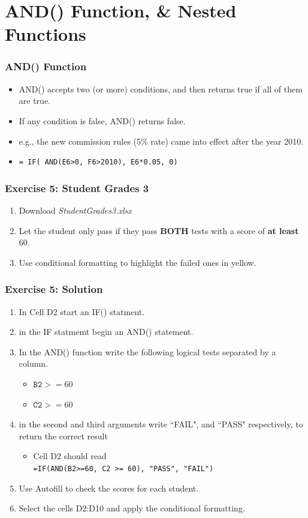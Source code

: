 \documentclass[12pt]{beamer}
\begin{document}
	\section{AND() Function, \& Nested Functions}
	\begin{frame}
	\frametitle{AND() Function}
	\begin{itemize}
	\item AND() accepts two (or more) conditions, and then returns true if all of them are true.
	\item If any condition is false, AND() returns false. 
	\item e.g., the new commission rules (5\% rate)
	came into effect after the year 2010. 
	\item \texttt{= IF( AND(E6>0, F6>2010), E6*0.05, 0)}
	\end{itemize}	
\end{frame}
\begin{frame}
	\frametitle{Exercise 5: Student Grades 3}
	\begin{enumerate}
		\item Download \textit{StudentGrades3.xlsx}
		\item Let the student only pass if they pass \textbf{BOTH} tests with a score of \textbf{at least} 60. 
		\item Use conditional formatting to highlight the failed ones in yellow. 
	\end{enumerate}
\end{frame}
\begin{frame}
	\frametitle{Exercise 5: Solution}
	\begin{enumerate}
		\item In Cell D2 start an IF() statment.
		\item in the IF statmemt begin an AND() statement.
		\item In the AND() function write the following logical tests separated by a column.
		\begin{itemize}
			\item $\texttt{B2}>=60$ 
			\item $\texttt{C2}>=60$
		\end{itemize}
		\item in the second and third arguments write ``FAIL", and ``PASS" respectively, to return the correct result 
		\begin{itemize}
			\item Cell D2 should read\\
			\texttt{=IF(AND(B2>=60, C2 >= 60), "PASS", "FAIL")} 
		\end{itemize}
		\item Use Autofill to check the scores for each student.
		\item Select the cells D2:D10 and apply the conditional formatting.
	\end{enumerate}
\end{frame}
\end{document}
